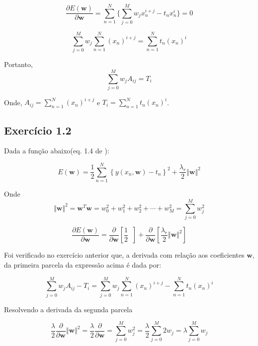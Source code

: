 \documentclass{article}
\begin{document}
	
	
	\[
	 \frac{\partial E(\mathbf{w})}{\partial \mathbf{w}}= \sum_{n=1}^{N} \{ \sum_{j=0}^{M}w_{j} x_{n}^{i+j}- t_{n}x_{n}^{i} \} =0  
	\]
	
	
	
	
	\[
	 \sum_{j=0}^{M}  w_{j}\sum_{n=1}^{N}(x_{n})^{i+j} = \sum_{n=1}^{N} t_{n}(x_{n})^{i}   
	\]
	
	Portanto,
	\[
	 \sum_{j=0}^{M}  w_{j} A_{ij} = T_{i}   
	\]
	
	Onde, $A_{ij} = \sum_{n=1}^{N}(x_{n})^{i+j}$  e	$T_{i} = \sum_{n=1}^{N} t_{n}(x_{n})^{i}$.
	
	


\subsection{ Exerc\'icio 1.2}
   
    Dada a função abaixo(eq. 1.4 de \cite{Bishop2006}):
   
    \begin{equation}
	  E(\mathbf{w})=\frac{1}{2}\sum_{n=1}^{N}\left\{ y\left(x_{n},\mathbf{w}\right)-t_{n}\right\} ^{2}+\frac{\lambda_{r}}{2}\Vert \mathbf{w}\Vert^{2}                               \label{eq101_ML}
    \end{equation}
    
    Onde 
    \begin{equation}
       \Vert \mathbf{w}\Vert^{2} = \mathbf{w}^{T}\mathbf{w} = w_{0}^2+w_{1}^2+w_{2}^2+ \cdots+ w_{M}^2 = \sum_{j=0}^{M}w_{j}^2
    \end{equation}
    
    
    \[
    \frac{\partial E(\mathbf{w})}{\partial \mathbf{w}}=\frac{\partial}{\partial \mathbf{w}}\left[\frac{1}{2}\mathop{\sum_{n=1}^{N}\left\{ y\left(x_{n}, \mathbf{w}\right)-t_{n} \right\}^{2} }\right] +  \frac{\partial}{\partial \mathbf{w}} \left[ \frac{\lambda_{r}}{2}\Vert \mathbf{w}\Vert^{2}\right]
    \]
    
    Foi verificado no exercício anterior que, a derivada com relação aos coeficientes $\mathbf{w}$, da primeira parcela da expressão acima é dada por:
    
     \[
      \sum_{j=0}^{M}  w_{j} A_{ij} - T_{i} =  \sum_{j=0}^{M}  w_{j}\sum_{n=1}^{N}(x_{n})^{i+j} - \sum_{n=1}^{N} t_{n}(x_{n})^{i}
     \]
    
    Resolvendo a derivada da segunda parcela 
    
    \[
    \frac{\lambda}{2} \frac{\partial}{\partial \mathbf{w}} \Vert \mathbf{w}\Vert^{2} =\frac{\lambda}{2} \frac{\partial}{\partial \mathbf{w}} = \sum_{j=0}^{M}w_{j}^2 = \frac{\lambda}{2} \sum_{j=0}^{M} 2 w_{j} = \lambda \sum_{j=0}^{M} w_{j}
    \]
    
\end{document}
